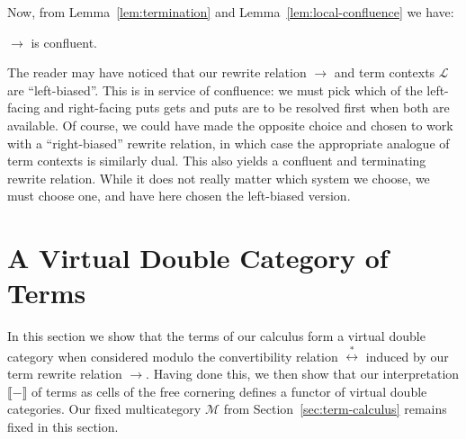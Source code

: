 \documentclass[twoside,11pt,final]{entics}
\begin{document}
Now, from Lemma~\ref{lem:termination} and Lemma~\ref{lem:local-confluence} we have:
\begin{theorem}\label{thm:confluence}
  $\to$ is confluent.
\end{theorem}

The reader may have noticed that our rewrite relation $\to$ and term contexts $\mathcal{L}$ are ``left-biased''. This is in service of confluence: we must pick which of the left-facing and right-facing puts gets and puts are to be resolved first when both are available. Of course, we could have made the opposite choice and chosen to work with a ``right-biased'' rewrite relation, in which case the appropriate analogue of term contexts is similarly dual. This also yields a confluent and terminating rewrite relation. While it does not really matter which system we choose, we must choose one, and have here chosen the left-biased version.

\section{A Virtual Double Category of Terms}\label{sec:vdc}

In this section we show that the terms of our calculus form a virtual double category when considered modulo the convertibility relation $\stackrel{*}{\leftrightarrow}$ induced by our term rewrite relation $\to$. Having done this, we then show that our interpretation $\llbracket - \rrbracket$ of terms as cells of the free cornering defines a functor of virtual double categories. Our fixed multicategory $\mathcal{M}$ from Section~\ref{sec:term-calculus} remains fixed in this section.
\end{document}
